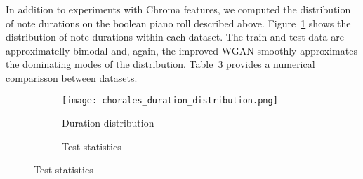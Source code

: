 In addition to experiments with Chroma features, we computed the distribution of
note durations on the boolean piano roll described above.
Figure~\ref{fig:chorales_duration_distribution} shows the distribution of
note durations within each dataset. The train and test data are approximatelly
bimodal and, again, the improved WGAN smoothly approximates the
dominating modes of the distribution. Table~\ref{tbl:duration} provides a numerical 
comparisson between datasets.


\begin{figure}[!h]
    \begin{subfigure}[b]{0.65\textwidth}
        \texttt{[image: chorales\_duration\_distribution.png]}
        \caption{Duration distribution}
        \label{fig:chorales_duration_distribution}
    \end{subfigure}
    \quad
    \begin{subfigure}[b]{0.3\textwidth}
        \caption{Test statistics}
        \label{tbl:duration}
    \end{subfigure}
\end{figure}

